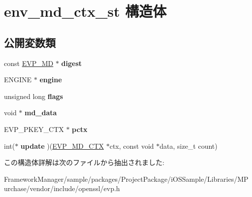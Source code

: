 \hypertarget{structenv__md__ctx__st}{}\section{env\+\_\+md\+\_\+ctx\+\_\+st 構造体}
\label{structenv__md__ctx__st}
\subsection*{公開変数類}
\begin{DoxyCompactItemize}
\item 
\hypertarget{structenv__md__ctx__st_a5cd23227051f7f605039f24f105f0dea}{}const \hyperlink{structenv__md__st}{E\+V\+P\+\_\+\+M\+D} $\ast$ {\bfseries digest}\label{structenv__md__ctx__st_a5cd23227051f7f605039f24f105f0dea}

\item 
\hypertarget{structenv__md__ctx__st_aa74b6022586da8be425ea8eb897a8130}{}E\+N\+G\+I\+N\+E $\ast$ {\bfseries engine}\label{structenv__md__ctx__st_aa74b6022586da8be425ea8eb897a8130}

\item 
\hypertarget{structenv__md__ctx__st_aae521b439879e6584b766d7703741d43}{}unsigned long {\bfseries flags}\label{structenv__md__ctx__st_aae521b439879e6584b766d7703741d43}

\item 
\hypertarget{structenv__md__ctx__st_a9e1598967116d321673826a7909e7efa}{}void $\ast$ {\bfseries md\+\_\+data}\label{structenv__md__ctx__st_a9e1598967116d321673826a7909e7efa}

\item 
\hypertarget{structenv__md__ctx__st_aaf0d8bf6f34617159fd263074a07a555}{}E\+V\+P\+\_\+\+P\+K\+E\+Y\+\_\+\+C\+T\+X $\ast$ {\bfseries pctx}\label{structenv__md__ctx__st_aaf0d8bf6f34617159fd263074a07a555}

\item 
\hypertarget{structenv__md__ctx__st_a55517be3f51260fe504e146b9b651d60}{}int($\ast$ {\bfseries update} )(\hyperlink{structenv__md__ctx__st}{E\+V\+P\+\_\+\+M\+D\+\_\+\+C\+T\+X} $\ast$ctx, const void $\ast$data, size\+\_\+t count)\label{structenv__md__ctx__st_a55517be3f51260fe504e146b9b651d60}

\end{DoxyCompactItemize}


この構造体詳解は次のファイルから抽出されました\+:\begin{DoxyCompactItemize}
\item 
Framework\+Manager/sample/packages/\+Project\+Package/i\+O\+S\+Sample/\+Libraries/\+M\+Purchase/vendor/include/openssl/evp.\+h\end{DoxyCompactItemize}
